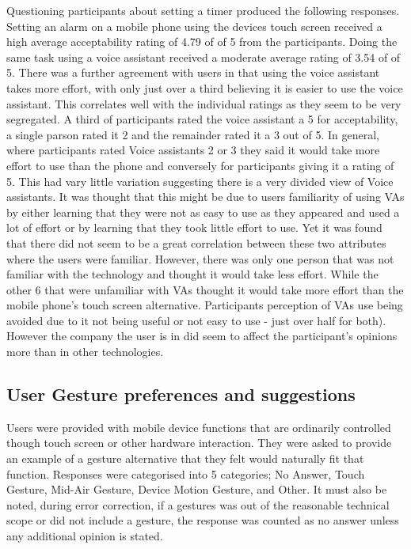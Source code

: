 \documentclass{l4proj}
\begin{document}
Questioning participants about setting a timer produced the following responses. Setting an alarm on a mobile phone using the devices touch screen received a high average acceptability rating of 4.79 of of 5 from the participants. Doing the same task using a voice assistant received a moderate average rating of 3.54 of of 5. There was a further agreement with users in that using the voice assistant takes more effort, with only just over a third believing it is easier to use the voice assistant. This correlates well with the individual ratings as they seem to be very segregated. A third of participants rated the voice assistant a 5 for acceptability, a single parson rated it 2 and the remainder rated it a 3 out of 5. In general, where participants rated Voice assistants 2 or 3 they said it would take more effort to use than the phone and conversely for participants giving it a rating of 5. This had vary little variation suggesting there is a very divided view of Voice assistants. It was thought that this might be due to users familiarity of using VAs by either learning that they were not as easy to use as they appeared and used a lot of effort or by learning that they took little effort to use. Yet it was found that there did not seem to be a great correlation between these two attributes where the users were familiar. However, there was only one person that was not familiar with the technology and thought it would take less effort. While the other 6 that were unfamiliar with VAs thought it would take more effort than the mobile phone's touch screen alternative. Participants perception of VAs use being avoided due to it not being useful or not easy to use - just over half for both). However the company the user is in did seem to affect the participant's opinions more than in other technologies.

\subsection{User Gesture preferences and suggestions}
Users were provided with mobile device functions that are ordinarily controlled though touch screen or other hardware interaction. They were asked to provide an example of a gesture alternative that they felt would naturally fit that function. Responses were categorised into 5 categories; No Answer, Touch Gesture, Mid-Air Gesture, Device Motion Gesture, and Other. It must also be noted, during error correction, if a gestures was out of the reasonable technical scope or did not include a gesture, the response was counted as no answer unless any additional opinion is stated.
\end{document}
